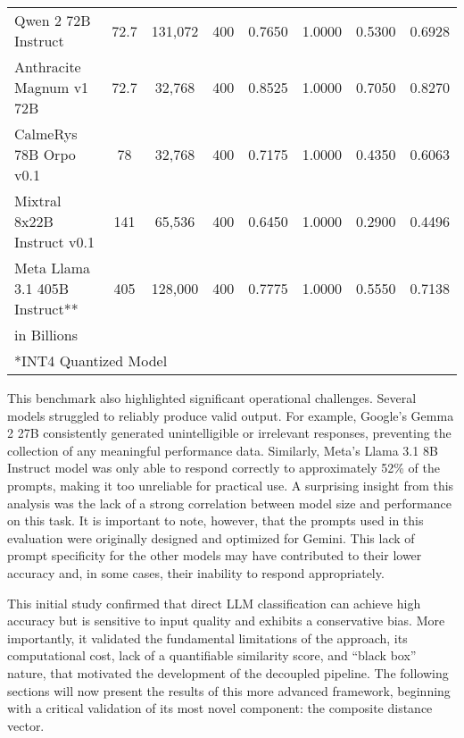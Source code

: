 \begin{table}[tb]
{\begin{tabular}{lccccccc}
            Qwen 2 72B Instruct             & 72.7                 & 131,072                         & 400              & 0.7650            & 1.0000 & 0.5300          & 0.6928          \\
            Anthracite Magnum v1 72B        & 72.7                 & 32,768                          & 400              & 0.8525            & 1.0000 & 0.7050          & 0.8270          \\
            CalmeRys 78B Orpo v0.1          & 78                   & 32,768                          & 400              & 0.7175            & 1.0000 & 0.4350          & 0.6063          \\
            Mixtral 8x22B Instruct v0.1     & 141                  & 65,536                          & 400              & 0.6450            & 1.0000 & 0.2900          & 0.4496          \\
            Meta Llama 3.1 405B Instruct**  & 405                  & 128,000                         & 400              & 0.7775            & 1.0000 & 0.5550          & 0.7138          \\
            \bottomrule
            \multicolumn{8}{l}{\footnotesize *in Billions}                                                                                                                               \\
            \multicolumn{8}{l}{\footnotesize **INT4 Quantized Model}
        \end{tabular}
    }
\end{table}

This benchmark also highlighted significant operational challenges. Several models struggled to reliably produce valid output. For example, Google's Gemma 2 27B consistently generated unintelligible or irrelevant responses, preventing the collection of any meaningful performance data. Similarly, Meta's Llama 3.1 8B Instruct model was only able to respond correctly to approximately 52\% of the prompts, making it too unreliable for practical use. A surprising insight from this analysis was the lack of a strong correlation between model size and performance on this task. It is important to note, however, that the prompts used in this evaluation were originally designed and optimized for Gemini. This lack of prompt specificity for the other models may have contributed to their lower accuracy and, in some cases, their inability to respond appropriately.

This initial study confirmed that direct LLM classification can achieve high accuracy but is sensitive to input quality and exhibits a conservative bias. More importantly, it validated the fundamental limitations of the approach, its computational cost, lack of a quantifiable similarity score, and ``black box'' nature, that motivated the development of the decoupled pipeline. The following sections will now present the results of this more advanced framework, beginning with a critical validation of its most novel component: the composite distance vector.

